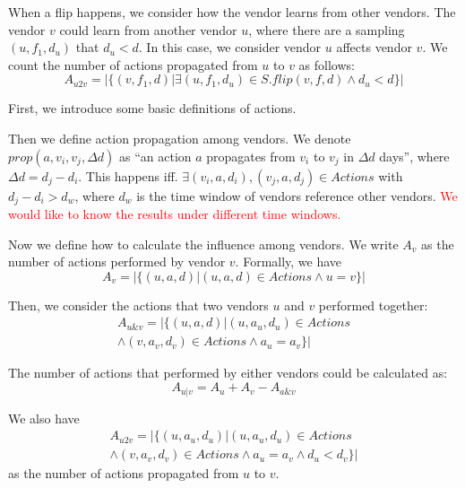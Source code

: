 When a flip happens, we consider how the vendor learns from other vendors. The vendor $v$ could learn from another vendor $u$, where there are a sampling $(u, f_1, d_u)$ that $d_u < d$. In this case, we consider vendor $u$ affects vendor $v$. 
We count the number of actions propagated from $u$ to $v$ as follows:
\begin{equation}
A_{u2v} = |\{(v, f_1, d)| \exists (u, f_1, d_u)\in S. flip(v, f, d) \land d_u<d \}|
\end{equation}

First, we introduce some basic definitions of actions. 

Then we define action propagation among vendors. 
We denote $prop(a, v_i, v_j, \Delta d)$ as ``an action $a$ propagates from $v_i$ to $v_j$ in $\Delta d$ days'', where $\Delta d = d_j-d_i$. 
This happens iff. $\exists (v_i, a, d_i), (v_j, a, d_j) \in Actions$ with $d_j-d_i>d_w$, where $d_w$ is the time window of vendors reference other vendors. \textcolor{red}{We would like to know the results under different time windows.} 

Now we define how to calculate the influence among vendors. 
We write $A_v$ as the number of actions performed by vendor $v$. 
Formally, we have 
\begin{equation}
A_v = |\{(u, a, d) | (u, a, d) \in Actions \land u=v\}| 
\end{equation}

Then, we consider the actions that two vendors $u$ and $v$ performed together: 
\begin{multline}
A_{u\&v} = |\{(u, a, d) | (u, a_u, d_u) \in Actions \\ \land (v, a_v, d_v) \in Actions \land a_u=a_v \}|
\end{multline}

The number of actions that performed by either vendors could be calculated as: 
\begin{equation}
A_{u|v} = A_u+A_v-A_{a\&v}
\end{equation}

We also have 
\begin{multline}
A_{u2v} = |\{(u, a_u, d_u) | (u, a_u, d_u) \in Actions \\ \land (v, a_v, d_v) \in Actions \land a_u=a_v \land d_u<d_v \}|
\end{multline}
 as the number of actions propagated from $u$ to $v$. 

